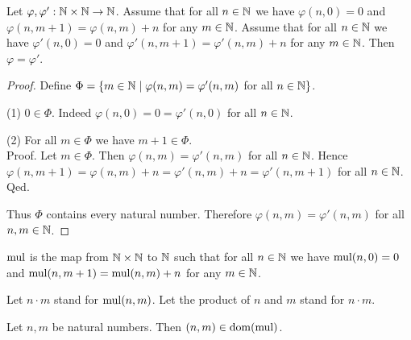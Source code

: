 \documentclass[10pt]{article}
\begin{document}
  \begin{forthel}
    \begin{lemma}
      Let $\varphi, \varphi' : \mathbb{N} \times \mathbb{N} \to \mathbb{N}$.
      Assume that for all $n \in \mathbb{N}$ we have $\varphi(n, 0) = 0$ and
      $\varphi(n, m + 1) = \varphi(n,m) + n$ for any $m \in \mathbb{N}$.
      Assume that for all $n \in \mathbb{N}$ we have $\varphi'(n, 0) = 0$ and
      $\varphi'(n, m + 1) = \varphi'(n,m) + n$ for any $m \in \mathbb{N}$.
      Then $\varphi = \varphi'$.
    \end{lemma}
    \begin{proof}
      Define $\Phi = \{ m \in \mathbb{N} \mid \varphi(n,m) = \varphi'(n,m)$ for
      all $n \in \mathbb{N} \}$.

      (1) $0 \in \Phi$.
      Indeed $\varphi(n,0) = 0 = \varphi'(n,0)$ for all $n \in \mathbb{N}$.

      (2) For all $m \in \Phi$ we have $m + 1 \in \Phi$. \\
      Proof.
        Let $m \in \Phi$.
        Then $\varphi(n,m) = \varphi'(n,m)$ for all $n \in \mathbb{N}$.
        Hence $\varphi(n, m + 1)
          = \varphi(n,m) + n
          = \varphi'(n,m) + n
          = \varphi'(n, m + 1)$
        for all $n \in \mathbb{N}$.
      Qed.

      Thus $\Phi$ contains every natural number.
      Therefore $\varphi(n,m) = \varphi'(n,m)$ for all $n, m \in \mathbb{N}$.
    \end{proof}
  \end{forthel}

  \begin{forthel}
    \begin{definition}
      $\textrm{mul}$ is the map from $\mathbb{N} \times \mathbb{N}$ to $\mathbb{N}$ such that for all
      $n \in \mathbb{N}$ we have $\textrm{mul}(n, 0) = 0$ and $\textrm{mul}(n, m + 1) =
      \textrm{mul}(n, m) + n$ for any $m \in \mathbb{N}$.
    \end{definition}

    Let $n \cdot m$ stand for $\textrm{mul}(n, m)$.
    Let the product of $n$ and $m$ stand for $n \cdot m$.
  \end{forthel}

  \begin{forthel}
    \begin{lemma}
      Let $n, m$ be natural numbers.
      Then $(n,m) \in \operatorname{dom}(\textrm{mul})$.
    \end{lemma}
  \end{forthel}
\end{document}
